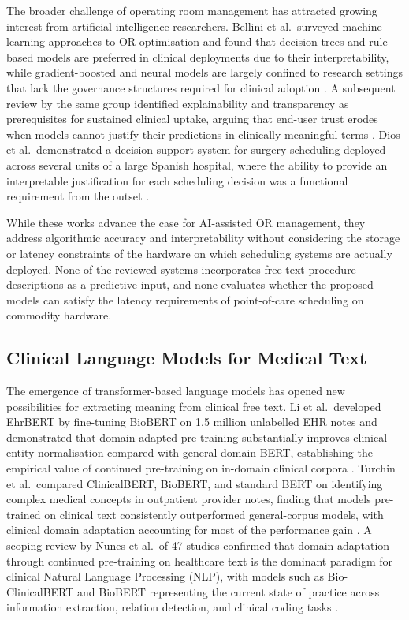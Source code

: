 \documentclass[3p]{elsarticle}
\begin{document}
The broader challenge of operating room management has attracted growing interest from artificial intelligence researchers. Bellini et al.\ surveyed machine learning approaches to OR optimisation and found that decision trees and rule-based models are preferred in clinical deployments due to their interpretability, while gradient-boosted and neural models are largely confined to research settings that lack the governance structures required for clinical adoption \cite{bellini2020artificial}. A subsequent review by the same group identified explainability and transparency as prerequisites for sustained clinical uptake, arguing that end-user trust erodes when models cannot justify their predictions in clinically meaningful terms \cite{bellini2024artificial}. Dios et al.\ demonstrated a decision support system for surgery scheduling deployed across several units of a large Spanish hospital, where the ability to provide an interpretable justification for each scheduling decision was a functional requirement from the outset \cite{dios2015decision}.

While these works advance the case for AI-assisted OR management, they address algorithmic accuracy and interpretability without considering the storage or latency constraints of the hardware on which scheduling systems are actually deployed. None of the reviewed systems incorporates free-text procedure descriptions as a predictive input, and none evaluates whether the proposed models can satisfy the latency requirements of point-of-care scheduling on commodity hardware.

\subsection{Clinical Language Models for Medical Text}
\label{sec:rw_clm}

The emergence of transformer-based language models has opened new possibilities for extracting meaning from clinical free text. Li et al.\ developed EhrBERT by fine-tuning BioBERT on 1.5 million unlabelled EHR notes and demonstrated that domain-adapted pre-training substantially improves clinical entity normalisation compared with general-domain BERT, establishing the empirical value of continued pre-training on in-domain clinical corpora \cite{li2019fine}. Turchin et al.\ compared ClinicalBERT, BioBERT, and standard BERT on identifying complex medical concepts in outpatient provider notes, finding that models pre-trained on clinical text consistently outperformed general-corpus models, with clinical domain adaptation accounting for most of the performance gain \cite{turchin2023comparison}. A scoping review by Nunes et al.\ of 47 studies confirmed that domain adaptation through continued pre-training on healthcare text is the dominant paradigm for clinical Natural Language Processing (NLP), with models such as Bio-ClinicalBERT and BioBERT representing the current state of practice across information extraction, relation detection, and clinical coding tasks \cite{nunes2024health}.
\end{document}
